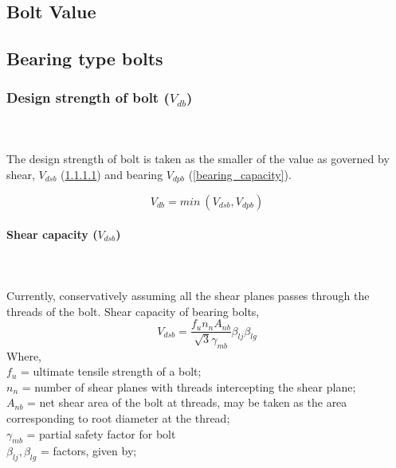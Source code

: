 \documentclass[11.5pt,a4paper,oneside]{report}
\begin{document}
\begin{Form}
\section{Bolt Value}
\subsection{Bearing type bolts}

\subsubsection{Design strength of bolt (\boldmath $V_{db}$)}
\qquad [Reference: Cl. 10.3.2, IS 800:2007] \\ \\ 

\noindent The design strength of bolt is taken as the smaller of the value as governed by shear, $V_{dsb}$ (\ref{shear_capacity}) and bearing $V_{dpb}$ (\ref{bearing_capacity}).

\begin{equation}
	V_{db} = min~ (V_{dsb}, V_{dpb})
\end{equation}

\paragraph{Shear capacity (\boldmath $V_{dsb}$)}
\label{shear_capacity}
\qquad \qquad [Reference: Cl. 10.3.3, IS 800:2007] \\ \\
Currently, conservatively assuming all the shear planes passes through the threads of the bolt. Shear capacity of bearing bolts,
\begin{equation}
	V_{dsb} = \frac{f_u n_n A_{nb}}{\sqrt{3} \gamma_{mb}} \beta_{lj} \beta_{lg} 
\end{equation}
Where, \\
\indent $f_u$ = ultimate tensile strength of a bolt;\\
\indent $n_n$ =  number of shear planes with threads intercepting the shear plane; \\
\indent $A_{nb}$ = net shear area of the bolt at threads, may be taken as the area corresponding to root diameter at the thread;\\
\indent $\gamma_{mb}$ = partial safety factor for bolt\\
\indent $\beta_{lj}, \beta_{lg}$ = factors, given by;


\end{Form}
\end{document}
